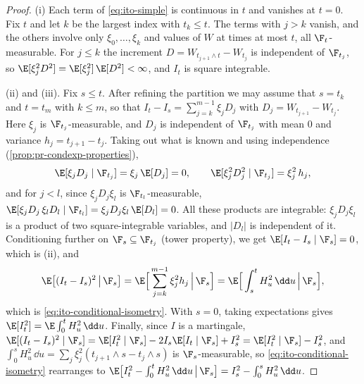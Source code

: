 \begin{proof}
(i) Each term of \eqref{eq:ito-simple} is continuous in $t$ and vanishes at $t=0$. Fix $t$
and let $k$ be the largest index with $t_k\le t$. The terms with $j>k$ vanish, and the
others involve only $\xi_0,\dots,\xi_k$ and values of $W$ at times at most $t$, all
$\F_t$-measurable. For $j\le k$ the increment $D=W_{t_{j+1}\wedge t}-W_{t_j}$ is independent of
$\F_{t_j}$, so $\E[\xi_j^2D^2]=\E[\xi_j^2]\,\E[D^2]<\infty$, and $I_t$ is square integrable.

(ii) and (iii). Fix $s\le t$. After refining the partition we may assume that $s=t_k$ and
$t=t_m$ with $k\le m$, so that $I_t-I_s=\sum_{j=k}^{m-1}\xi_jD_j$ with
$D_j=W_{t_{j+1}}-W_{t_j}$. Here $\xi_j$ is $\F_{t_j}$-measurable, and $D_j$ is independent of
$\F_{t_j}$ with mean $0$ and variance $h_j=t_{j+1}-t_j$. Taking out what is known and using
independence (\cref{prop:pr-condexp-properties}),
\[
  \E[\xi_jD_j\mid\F_{t_j}]=\xi_j\,\E[D_j]=0,\qquad
  \E[\xi_j^2D_j^2\mid\F_{t_j}]=\xi_j^2\,h_j ,
\]
and for $j<l$, since $\xi_jD_j\xi_l$ is $\F_{t_l}$-measurable,
$\E[\xi_jD_j\,\xi_lD_l\mid\F_{t_l}]=\xi_jD_j\xi_l\,\E[D_l]=0$. All these products are
integrable: $\xi_jD_j\xi_l$ is a product of two square-integrable variables, and $|D_l|$ is
independent of it. Conditioning further on $\F_s\subseteq\F_{t_j}$ (tower property), we get
$\E[I_t-I_s\mid\F_s]=0$, which is (ii), and
\[
  \E\big[(I_t-I_s)^2\,\big|\,\F_s\big]=\E\Big[\sum_{j=k}^{m-1}\xi_j^2h_j\,\Big|\,\F_s\Big]
  =\E\Big[\int_s^tH_u^2\,\dd u\,\Big|\,\F_s\Big],
\]
which is \eqref{eq:ito-conditional-isometry}. With $s=0$, taking expectations gives
$\E[I_t^2]=\E\int_0^tH_u^2\,\dd u$. Finally, since $I$ is a martingale,
$\E[(I_t-I_s)^2\mid\F_s]=\E[I_t^2\mid\F_s]-2I_s\E[I_t\mid\F_s]+I_s^2=\E[I_t^2\mid\F_s]-I_s^2$,
and $\int_0^sH_u^2\,\dd u=\sum_j\xi_j^2(t_{j+1}\wedge s-t_j\wedge s)$ is $\F_s$-measurable,
so \eqref{eq:ito-conditional-isometry} rearranges to
$\E\big[I_t^2-\int_0^tH_u^2\,\dd u\,\big|\,\F_s\big]=I_s^2-\int_0^sH_u^2\,\dd u$.


\end{proof}
